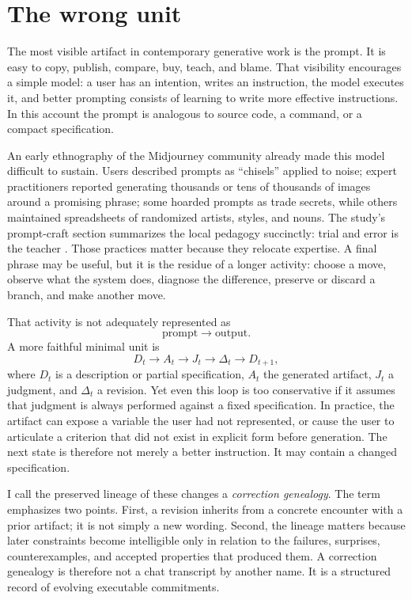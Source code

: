 \documentclass[11pt]{article}
\begin{document}
\section{The wrong unit}

The most visible artifact in contemporary generative work is the prompt. It is easy to copy, publish, compare, buy, teach, and blame. That visibility encourages a simple model: a user has an intention, writes an instruction, the model executes it, and better prompting consists of learning to write more effective instructions. In this account the prompt is analogous to source code, a command, or a compact specification.

An early ethnography of the Midjourney community already made this model difficult to sustain. Users described prompts as ``chisels'' applied to noise; expert practitioners reported generating thousands or tens of thousands of images around a promising phrase; some hoarded prompts as trade secrets, while others maintained spreadsheets of randomized artists, styles, and nouns. The study's prompt-craft section summarizes the local pedagogy succinctly: trial and error is the teacher \cite{sun_hartsoe_ottolin2022_sculptors}. Those practices matter because they relocate expertise. A final phrase may be useful, but it is the residue of a longer activity: choose a move, observe what the system does, diagnose the difference, preserve or discard a branch, and make another move.

That activity is not adequately represented as
\[
\text{prompt} \rightarrow \text{output}.
\]
A more faithful minimal unit is
\[
D_t \rightarrow A_t \rightarrow J_t \rightarrow \Delta_t \rightarrow D_{t+1},
\]
where $D_t$ is a description or partial specification, $A_t$ the generated artifact, $J_t$ a judgment, and $\Delta_t$ a revision. Yet even this loop is too conservative if it assumes that judgment is always performed against a fixed specification. In practice, the artifact can expose a variable the user had not represented, or cause the user to articulate a criterion that did not exist in explicit form before generation. The next state is therefore not merely a better instruction. It may contain a changed specification.

I call the preserved lineage of these changes a \emph{correction genealogy}. The term emphasizes two points. First, a revision inherits from a concrete encounter with a prior artifact; it is not simply a new wording. Second, the lineage matters because later constraints become intelligible only in relation to the failures, surprises, counterexamples, and accepted properties that produced them. A correction genealogy is therefore not a chat transcript by another name. It is a structured record of evolving executable commitments.
\end{document}
